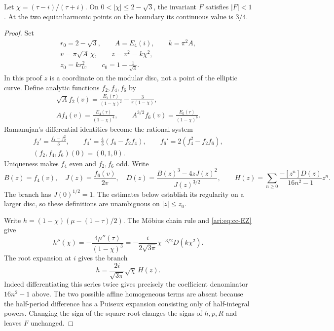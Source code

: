 \begin{proposition}\label{ari:C.8.14}
Let $\chi=(\tau-i)/(\tau+i)$. On
$0<|\chi|\le2-\sqrt3$, the invariant $F$ satisfies $|F|<1$.
At the two equianharmonic points on the boundary its continuous
value is $3/4$.
\end{proposition}
\begin{proof}
Set
\[
 \begin{gathered}
 r_0=2-\sqrt3,\qquad A=E_4(i),\qquad k=\pi^2A,\\
 v=\pi\sqrt A\,\chi,\qquad z=v^2=k\chi^2,\\
 z_0=kr_0^2,\qquad c_0=1-\frac1{\sqrt3}.
 \end{gathered}
\]
In this proof $z$ is a coordinate on the modular disc, not a
point of the elliptic curve. Define analytic functions $f_2,f_4,f_6$
by
\[
 \begin{gathered}
 \sqrt A f_2(v)=\frac{E_2(\tau)}{(1-\chi)^2}
                         -\frac3{\pi(1-\chi)},\\
 A f_4(v)=\frac{E_4(\tau)}{(1-\chi)^4},\qquad
 A^{3/2} f_6(v)=\frac{E_6(\tau)}{(1-\chi)^6}.
 \end{gathered}
\]
Ramanujan's differential identities become the rational system
\begin{equation}\label{ari:eq:cc-ode}
 \begin{gathered}
 f_2'=\frac{f_4-f_2^2}{3},\qquad
 f_4'=\frac43(f_6-f_2f_4),\qquad
 f_6'=2(f_4^2-f_2f_6),\\
 (f_2,f_4,f_6)(0)=(0,1,0).
 \end{gathered}
\end{equation}
Uniqueness makes $f_4$ even and $f_2,f_6$ odd. Write
\[
 B(z)=f_4(v),\quad J(z)=\frac{f_6(v)}{2v},\quad
 D(z)=\frac{B(z)^3-4zJ(z)^2}{J(z)^{3/2}},\qquad
 H(z)=\sum_{n\ge0}\frac{-[z^n]D(z)}{16n^2-1}z^n.
\]
The branch has $J(0)^{1/2}=1$. The estimates below establish
its regularity on a larger disc, so these definitions are
unambiguous on $|z|\le z_0$.

Write $h=(1-\chi)(\mu-(1-\tau)/2)$. The Möbius chain rule and
\eqref{ari:eq:cc-EZ} give
\[
 h''(\chi)=-\frac{4\mu''(\tau)}{(1-\chi)^3}
       =-\frac{i}{2\sqrt{3\pi}}\chi^{-3/2}D(k\chi^2).
\]
The root expansion at $i$ gives the branch
\begin{equation}\label{ari:eq:cc-h}
 h=\frac{2i}{\sqrt{3\pi}}\sqrt \chi\,H(z).
\end{equation}
Indeed differentiating this series twice gives precisely the
coefficient denominator $16n^2-1$ above. The two possible affine
homogeneous terms are absent because the half-period difference
has a Puiseux expansion consisting only of half-integral powers.
Changing the sign of the square root changes the signs of $h,p,R$
and leaves $F$ unchanged.


\end{proof}

